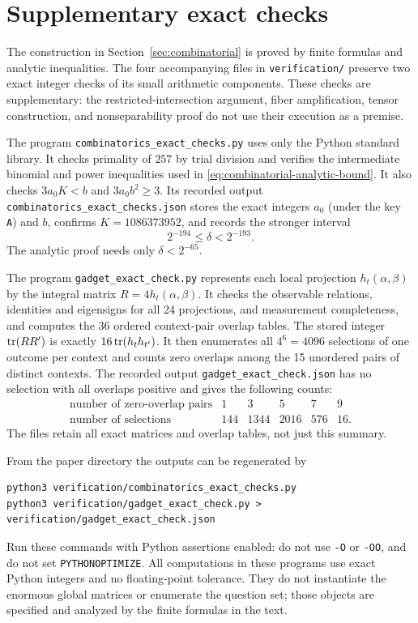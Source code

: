 \section{Supplementary exact checks}\label{app:supplementary-checks}

The construction in Section~\ref{sec:combinatorial} is proved by
finite formulas and analytic inequalities.  The four accompanying
files in \texttt{verification/} preserve two exact integer checks of its
small arithmetic components.  These checks are supplementary: the
restricted-intersection argument, fiber amplification, tensor
construction, and nonseparability proof do not use their execution
as a premise.

The program \texttt{combinatorics\_exact\_checks.py} uses only the
Python standard library.  It checks primality of \(257\) by trial
division and verifies the intermediate binomial and power inequalities
used in \eqref{eq:combinatorial-analytic-bound}.  It also checks
\(3a_0K<b\) and \(3a_0b^2\geq3\).  Its recorded output
\texttt{combinatorics\_exact\_checks.json} stores the exact integers
\(a_0\) (under the key \texttt{A}) and \(b\), confirms
\(K=1086373952\), and records the stronger interval
\begin{equation}\label{eq:supplementary-delta-interval}
 2^{-194}\leq\delta<2^{-193}.
\end{equation}
The analytic proof needs only \(\delta<2^{-65}\).

The program \texttt{gadget\_exact\_check.py} represents each local
projection \(h_t(\alpha,\beta)\) by the integral matrix
\(R=4h_t(\alpha,\beta)\).  It checks the observable relations,
identities and eigensigns for all 24 projections, and measurement
completeness, and computes the 36 ordered context-pair overlap tables.
The stored integer
\(\operatorname{tr}(RR')\) is exactly \(16\operatorname{tr}(h_t h_{t'})\).  It then enumerates
all \(4^6=4096\) selections of one outcome per context and counts
zero overlaps among the 15 unordered pairs of distinct contexts.
The recorded output \texttt{gadget\_exact\_check.json} has no
selection with all overlaps positive and gives the following counts:
\[
 \begin{array}{c|rrrrr}
  \text{number of zero-overlap pairs}&1&3&5&7&9\\ \hline
  \text{number of selections}&144&1344&2016&576&16.
 \end{array}
\]
The files retain all exact matrices and overlap tables, not just
this summary.

From the paper directory the outputs can be regenerated by
\begin{verbatim}
python3 verification/combinatorics_exact_checks.py
python3 verification/gadget_exact_check.py > verification/gadget_exact_check.json
\end{verbatim}
Run these commands with Python assertions enabled: do not use
\texttt{-O} or \texttt{-OO}, and do not set \texttt{PYTHONOPTIMIZE}.
All computations in these programs use exact Python integers and no
floating-point tolerance.  They do not instantiate the enormous
global matrices or enumerate the question set; those objects are
specified and analyzed by the finite formulas in the text.
